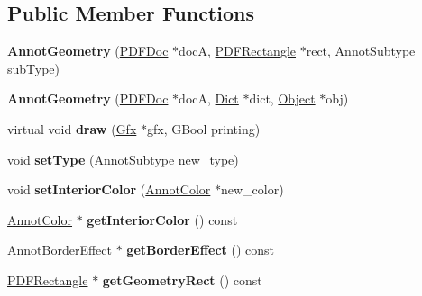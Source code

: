 \subsection*{Public Member Functions}
\begin{DoxyCompactItemize}
\item 
\mbox{\label{class_annot_geometry_a3e242867646aef408f26b20b95f90fdc}} 
{\bfseries Annot\+Geometry} (\hyperlink{class_p_d_f_doc}{P\+D\+F\+Doc} $\ast$docA, \hyperlink{class_p_d_f_rectangle}{P\+D\+F\+Rectangle} $\ast$rect, Annot\+Subtype sub\+Type)
\item 
\mbox{\label{class_annot_geometry_af3d28fe2cc7052ce463c014ba0740e78}} 
{\bfseries Annot\+Geometry} (\hyperlink{class_p_d_f_doc}{P\+D\+F\+Doc} $\ast$docA, \hyperlink{class_dict}{Dict} $\ast$dict, \hyperlink{class_object}{Object} $\ast$obj)
\item 
\mbox{\label{class_annot_geometry_a0f265393018b475b62693d2657f326d1}} 
virtual void {\bfseries draw} (\hyperlink{class_gfx}{Gfx} $\ast$gfx, G\+Bool printing)
\item 
\mbox{\label{class_annot_geometry_a0e9daa5dae56f30b97bd8c2e70a7f473}} 
void {\bfseries set\+Type} (Annot\+Subtype new\+\_\+type)
\item 
\mbox{\label{class_annot_geometry_aa97c5dd45501ff3dae35cef4de42ac34}} 
void {\bfseries set\+Interior\+Color} (\hyperlink{class_annot_color}{Annot\+Color} $\ast$new\+\_\+color)
\item 
\mbox{\label{class_annot_geometry_a42cc56b8bfefd891c9217200695c1e01}} 
\hyperlink{class_annot_color}{Annot\+Color} $\ast$ {\bfseries get\+Interior\+Color} () const
\item 
\mbox{\label{class_annot_geometry_a80bacb8918e6071c623039db17525f9f}} 
\hyperlink{class_annot_border_effect}{Annot\+Border\+Effect} $\ast$ {\bfseries get\+Border\+Effect} () const
\item 
\mbox{\label{class_annot_geometry_ad7eb13db7b0153c8cf6358ce2fb6c6d9}} 
\hyperlink{class_p_d_f_rectangle}{P\+D\+F\+Rectangle} $\ast$ {\bfseries get\+Geometry\+Rect} () const
\end{DoxyCompactItemize}
